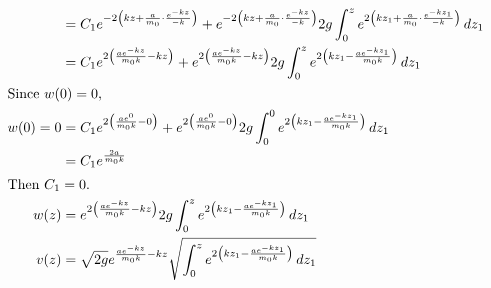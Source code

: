 \documentclass{esg8012pset}
\renewcommand{\d}{\,d}
\begin{document}
\begin{solution}
\begin{enumerate}[a)]
\begin{align*}
    & = C_1 e^{-2\left( k z + \frac{a}{m_0} \cdot \frac{e^{-k z}}{-k}\right)} + e^{-2\left( k z + \frac{a}{m_0}\cdot \frac{e^{-k z}}{-k}\right)} 2g\int_0^z e^{2\left(k z_1 + \frac{a}{m_0}\cdot \frac{e^{-k z_1}}{-k}\right)} \d z_1 \\
    & = C_1 e^{2\left(\frac{a e^{-k z}}{m_0 k} -  k z\right)} + e^{2\left(\frac{a e^{-k z}}{m_0 k} - k z\right)} 2g\int_0^z e^{2\left(k z_1 - \frac{a e^{-k z_1}}{m_0 k}\right)} \d z_1 \\
    \intertext{Since $w(0) = 0$,}
   w(0) = 0 & = C_1 e^{2\left(\frac{a e^{0}}{m_0 k} -  0 \right)} + e^{2\left(\frac{a e^{0}}{m_0 k} - 0\right)} 2g\int_0^0 e^{2\left(k z_1 - \frac{a e^{-k z_1}}{m_0 k}\right)} \d z_1 \\
    & = C_1 e^{\frac{2a}{m_0 k}}\\
   \intertext{Then $C_1 = 0$.}
   w(z) & = e^{2\left(\frac{a e^{-k z}}{m_0 k} - k z\right)} 2g\int_0^z e^{2\left(k z_1 - \frac{a e^{-k z_1}}{m_0 k}\right)} \d z_1 \\
   v(z) & = \sqrt{2g}e^{\frac{a e^{-k z}}{m_0 k} - k z} \sqrt{\int_0^z e^{2\left(k z_1 - \frac{a e^{-k z_1}}{m_0 k}\right)} \d z_1} \\
  \end{align*}%
  \end{enumerate}
\end{solution}
\end{document}
